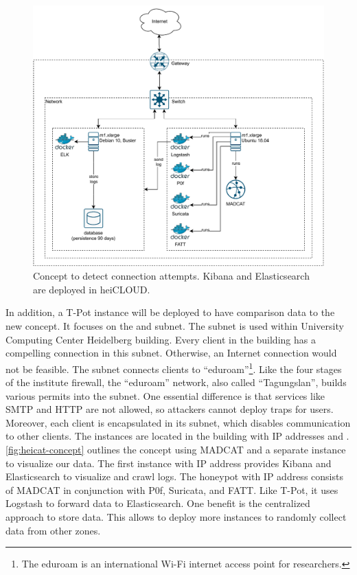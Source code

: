 \begin{figure}
    \centering
    \includegraphics[width=\textwidth]{figures/heicat-concept.pdf}
    \caption[Concept to detect connection attempts]{
        Concept to detect connection attempts.
        Kibana and Elasticsearch are deployed in heiCLOUD.
    }
    \label{fig:heicat-concept}
\end{figure}

In addition, a T-Pot instance will be deployed to have comparison data to the new concept.
It focuses on the  and  subnet.
The  subnet is used within University Computing Center Heidelberg building.
Every client in the building has a compelling connection in this subnet.
Otherwise, an Internet connection would not be feasible.
The subnet  connects clients to \enquote{eduroam}\footnote{The eduroam is an international Wi-Fi internet access point for researchers.}.
Like the four stages of the institute firewall, the \enquote{eduroam} network, also called \enquote{Tagungslan}, builds various permits into the subnet.
One essential difference is that services like SMTP and HTTP are not allowed, so attackers cannot deploy traps for users.
Moreover, each client is encapsulated in its subnet, which disables communication to other clients.
The instances are located in the building with IP addresses  and .
\autoref{fig:heicat-concept} outlines the concept using MADCAT and a separate instance to visualize our data.
The first instance with IP address  provides Kibana and Elasticsearch to visualize and crawl logs.
The honeypot with IP address  consists of MADCAT in conjunction with P0f, Suricata, and FATT.
Like T-Pot, it uses Logstash to forward data to Elasticsearch.
One benefit is the centralized approach to store data.
This allows to deploy more instances to randomly collect data from other zones.

